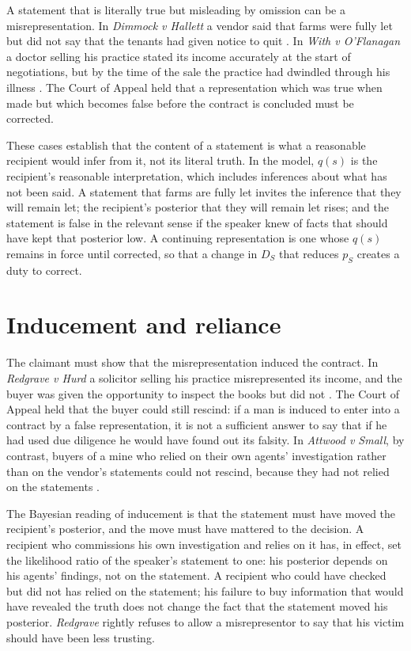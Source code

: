 A statement that is literally true but misleading by omission can be a misrepresentation. In \emph{Dimmock v Hallett} a vendor said that farms were fully let but did not say that the tenants had given notice to quit \citep{dimmock1866}. In \emph{With v O'Flanagan} a doctor selling his practice stated its income accurately at the start of negotiations, but by the time of the sale the practice had dwindled through his illness \citep{with1936}. The Court of Appeal held that a representation which was true when made but which becomes false before the contract is concluded must be corrected.

These cases establish that the content of a statement is what a reasonable recipient would infer from it, not its literal truth. In the model, $q(s)$ is the recipient's reasonable interpretation, which includes inferences about what has not been said. A statement that farms are fully let invites the inference that they will remain let; the recipient's posterior that they will remain let rises; and the statement is false in the relevant sense if the speaker knew of facts that should have kept that posterior low. A continuing representation is one whose $q(s)$ remains in force until corrected, so that a change in $D_S$ that reduces $p_S$ creates a duty to correct.

\section{Inducement and reliance}

The claimant must show that the misrepresentation induced the contract. In \emph{Redgrave v Hurd} a solicitor selling his practice misrepresented its income, and the buyer was given the opportunity to inspect the books but did not \citep{redgrave1881}. The Court of Appeal held that the buyer could still rescind: if a man is induced to enter into a contract by a false representation, it is not a sufficient answer to say that if he had used due diligence he would have found out its falsity. In \emph{Attwood v Small}, by contrast, buyers of a mine who relied on their own agents' investigation rather than on the vendor's statements could not rescind, because they had not relied on the statements \citep{attwood1838}.

The Bayesian reading of inducement is that the statement must have moved the recipient's posterior, and the move must have mattered to the decision. A recipient who commissions his own investigation and relies on it has, in effect, set the likelihood ratio of the speaker's statement to one: his posterior depends on his agents' findings, not on the statement. A recipient who could have checked but did not has relied on the statement; his failure to buy information that would have revealed the truth does not change the fact that the statement moved his posterior. \emph{Redgrave} rightly refuses to allow a misrepresentor to say that his victim should have been less trusting.


